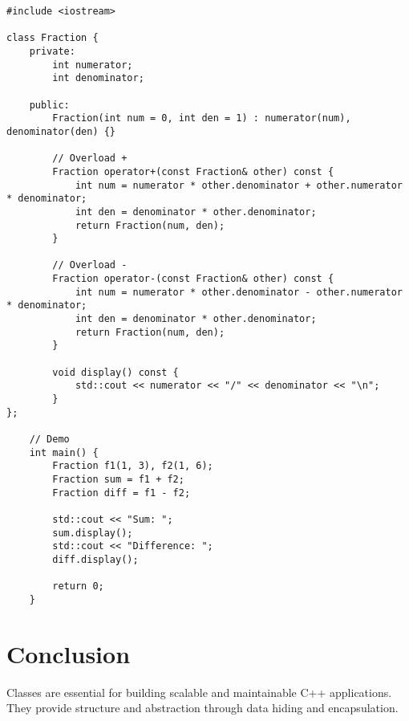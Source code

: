 \documentclass{article}
\begin{document}
\begin{lstlisting}[style=cppstyle]
	#include <iostream>

class Fraction {
    private:
		int numerator;
		int denominator;
	
	public:
		Fraction(int num = 0, int den = 1) : numerator(num), denominator(den) {}
	
		// Overload +
		Fraction operator+(const Fraction& other) const {
			int num = numerator * other.denominator + other.numerator * denominator;
			int den = denominator * other.denominator;
			return Fraction(num, den);
		}
	
		// Overload -
		Fraction operator-(const Fraction& other) const {
			int num = numerator * other.denominator - other.numerator * denominator;
			int den = denominator * other.denominator;
			return Fraction(num, den);
		}
	
		void display() const {
			std::cout << numerator << "/" << denominator << "\n";
		}
};
	
	// Demo
	int main() {
		Fraction f1(1, 3), f2(1, 6);
		Fraction sum = f1 + f2;
		Fraction diff = f1 - f2;
	
		std::cout << "Sum: ";
		sum.display();
		std::cout << "Difference: ";
		diff.display();
	
		return 0;
	}
\end{lstlisting}


\section{Conclusion}
Classes are essential for building scalable and maintainable C++ applications. They provide structure and abstraction through data hiding and encapsulation.
\end{document}
